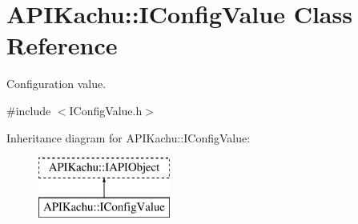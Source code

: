 \hypertarget{class_a_p_i_kachu_1_1_i_config_value}{}\section{A\+P\+I\+Kachu\+:\+:I\+Config\+Value Class Reference}
\label{class_a_p_i_kachu_1_1_i_config_value}


Configuration value.  




{\ttfamily \#include $<$I\+Config\+Value.\+h$>$}

Inheritance diagram for A\+P\+I\+Kachu\+:\+:I\+Config\+Value\+:\begin{figure}[H]
\begin{center}
\leavevmode
\includegraphics[height=2.000000cm]{class_a_p_i_kachu_1_1_i_config_value}
\end{center}
\end{figure}
